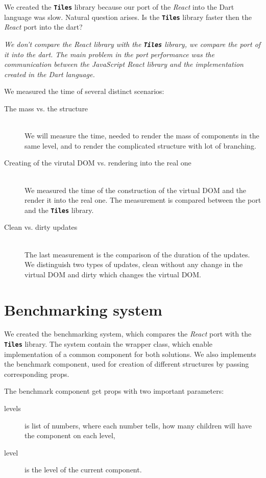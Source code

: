 \documentclass[oneside, 12pt]{book}
\newcommand{\tiles}[0]{\textbf{\texttt{Tiles}} }
\newcommand{\react}[0]{\textit{React} }
\begin{document}
We created the \tiles library because our port of the \react into the Dart language was slow. 
Natural question arises. Is the \tiles library faster then the \react port into the dart?

\textit{
	We don't compare the \react library with the \tiles library, we compare the port of it into the dart. 
	The main problem in the port performance was the communication between the JavaScript \react library and the implementation created in the Dart language.
}

We measured the time of several distinct scenarios:
\begin{description}
	\item[The mass vs. the structure] \hfill \\
		We will measure the time, needed to render the mass of components in the same level, 
		and to render the complicated structure with lot of branching.
	\item[Creating of the virutal DOM vs. rendering into the real one] \hfill \\
		We measured the time of the construction of the virtual DOM and the render it into the real one. 
		The measurement is compared between the port and the \tiles library.
	\item[Clean vs. dirty updates] \hfill \\
		The last measurement is the comparison of the duration of the updates. 
		We distinguish two types of updates, clean without any change in the virtual DOM and dirty which changes the virtual DOM.
\end{description}

\section{Benchmarking system}\label{sec:benchmarks-system}

We created the benchmarking system, which compares the \react port with the \tiles library.
The system contain the wrapper class, which enable implementation of a common component for both solutions.
We also implements the benchmark component, used for creation of different structures by passing corresponding props.

The benchmark component get props with two important parameters: 
\begin{description}
	\item[levels] is list of numbers, where each number tells, how many children will have the component on each level,
	\item[level] is the level of the current component.
\end{description}
\end{document}
